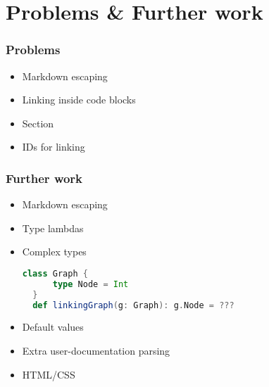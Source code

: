 \documentclass{beamer}
\begin{document}
\section{Problems \& Further work}

\begin{frame}
  \frametitle{Problems}
  \begin{itemize}
    \item Markdown escaping \pause
    \item Linking inside code blocks \pause
    \item Section \pause
    \item IDs for linking
  \end{itemize}
\end{frame}

\begin{frame}[fragile]
  \frametitle{Further work}
  \begin{itemize}
    \item Markdown escaping \pause
    \item Type lambdas \pause
    \item Complex types
\begin{lstlisting}[language=scala]
  class Graph {
      type Node = Int
  }
  def linkingGraph(g: Graph): g.Node = ???    
\end{lstlisting}\pause
    \item Default values \pause
    \item Extra user-documentation parsing \pause
    \item HTML/CSS
  \end{itemize}
\end{frame}
\end{document}
